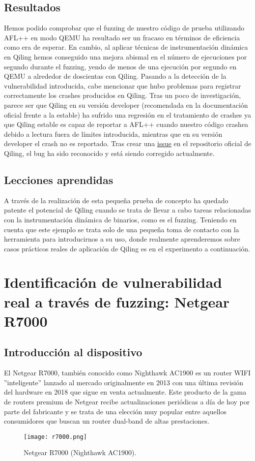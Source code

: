 \subsection{Resultados}
Hemos podido comprobar que el fuzzing de nuestro código de prueba utilizando AFL++ en modo QEMU ha resultado ser un fracaso en términos de 
eficiencia como era de esperar. En cambio,
al aplicar técnicas de instrumentación dinámica en Qiling hemos conseguido una mejora abismal en el número de ejecuciones por segundo durante el fuzzing, 
yendo de menos de una ejecución por segundo en QEMU a alrededor de doscientas con Qiling. Pasando a la detección de la vulnerabilidad introducida, 
cabe mencionar que hubo problemas para registrar correctamente los crashes producidos en Qiling. Tras un poco de investigación, parece ser que Qiling en su versión developer
(recomendada en la documentación oficial frente a la estable) ha sufrido una regresión en el tratamiento de crashes ya que Qiling estable es capaz de 
reportar a AFL++ cuando nuestro código crashea debido a lectura fuera de límites introducida, mientras que en su versión developer el crash no es reportado.
Tras crear una \href{https://github.com/qilingframework/qiling/issues/1163}{issue} en el repositorio oficial de Qiling\cite{qiling}, el bug ha sido reconocido y está siendo corregido actualmente.


\subsection{Lecciones aprendidas}
A través de la realización de esta pequeña prueba de concepto ha quedado patente el potencial de Qiling cuando se trata de llevar a cabo tareas relacionadas
con la instrumentación dinámica de binarios, como es el fuzzing. Teniendo en cuenta que este ejemplo se trata solo de una pequeña toma de contacto con la herramienta
para introducirnos a su uso, donde realmente aprenderemos sobre casos prácticos reales de aplicación de Qiling es en el experimento a continuación.

\section{Identificación de vulnerabilidad real a través de fuzzing: Netgear R7000}\label{r7000_section}
\subsection{Introducción al dispositivo}
El Netgear R7000, también conocido como Nighthawk AC1900 es un router WIFI ''inteligente'' lanzado al mercado originalmente en 2013 con una última
revisión del hardware en 2018 que sigue en venta actualmente. Este producto de la gama de routers premium de Netgear recibe actualizaciones periódicas
a día de hoy por parte del fabricante y se trata de una elección muy popular entre aquellos consumidores que buscan un router dual-band de altas prestaciones. 
\begin{figure}[H]
    \centering
    \texttt{[image: r7000.png]}
    \caption{Netgear R7000 (Nighthawk AC1900).}
    \label{fig:r7000}
\end{figure}

